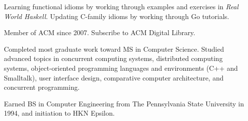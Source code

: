 \documentclass{tufte-handout}
\begin{document}
Learning
functional idioms by working through examples and exercises in
\emph{Real World Haskell}.  Updating C-family idioms by working through
Go tutorials.

Member of ACM since 2007.  Subscribe to ACM Digital Library.

Completed
most graduate work toward MS in Computer Science.  Studied advanced
topics in concurrent computing systems, distributed computing systems,
object-oriented programming languages and environments (C++ and
Smalltalk), user interface design, comparative computer architecture,
and concurrent programming.

Earned BS in Computer Engineering from The Pennsylvania State University
in 1994, and initiation to HKN Epsilon.
\end{document}
